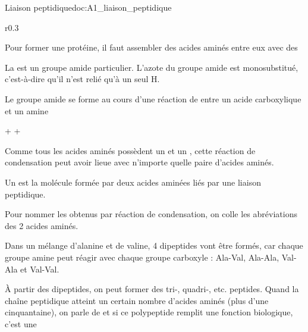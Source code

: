 \begin{doc}{Liaison peptidique}{doc:A1_liaison_peptidique}
  \begin{wrapfigure}[3]{r}{0.3\linewidth}
    \centering

  \end{wrapfigure}
  
  Pour former une protéine, il faut assembler des acides aminés entre eux avec des 

  \begin{importants}
    La  est un groupe amide particulier.
    L'azote du groupe amide est monosubstitué, c'est-à-dire qu'il n'est relié qu'à un seul H.
  \end{importants}

  Le groupe amide se forme au cours d'une réaction de  entre un acide carboxylique et un amine
  \vspace*{-4pt}
  
  \begin{center}
     +   
    \reaction
     +
    \eau
  \end{center}
  \vspace*{-4pt}

  Comme tous les acides aminés possèdent un  et un , cette réaction de condensation peut avoir lieue avec n'importe quelle paire d'acides aminés.

  \begin{importants}
    Un  est la molécule formée par deux acides aminées liés par une liaison peptidique.
    
    Pour nommer les  obtenus par réaction de condensation, on colle les abréviations des 2 acides aminés.
  \end{importants}

  Dans un mélange  d'alanine et de valine, 4 dipeptides vont être formés, car chaque groupe amine peut réagir avec chaque groupe carboxyle :
  Ala-Val, Ala-Ala, Val-Ala et Val-Val.

  \begin{importants}  
    À partir des dipeptides, on peut former des tri-, quadri-, etc. peptides.
    Quand la chaîne peptidique atteint un certain nombre d'acides aminés (plus d'une cinquantaine), on parle de  et si ce polypeptide remplit une fonction biologique, c'est une 
  \end{importants}
\end{doc}

